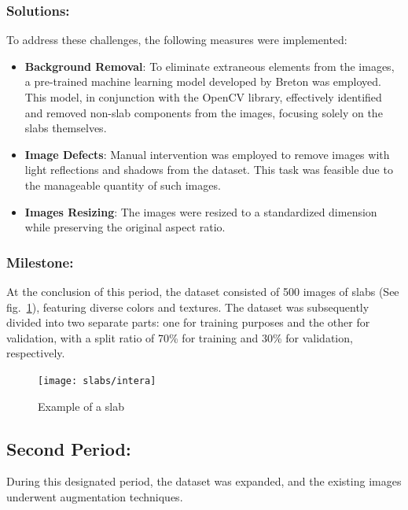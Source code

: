 \subsubsection{Solutions:}
To address these challenges, the following measures were implemented:
\begin{itemize}
    \item \textbf{Background Removal}: To eliminate extraneous elements from the images, a pre-trained machine learning model developed by Breton was employed. 
    This model, in conjunction with the OpenCV library, effectively identified and removed non-slab components from the images, focusing solely on the slabs themselves.
    \item \textbf{Image Defects}: Manual intervention was employed to remove images with light reflections and shadows from the dataset. 
    This task was feasible due to the manageable quantity of such images.
    \item \textbf{Images Resizing}: The images were resized to a standardized dimension while preserving the original aspect ratio.
\end{itemize}
\subsubsection{Milestone:}
At the conclusion of this period, the dataset consisted of 500 images of slabs (See fig.~\ref{fig:slab-sample}), featuring diverse colors and textures. 
The dataset was subsequently divided into two separate parts: one for training purposes and the other for validation, with a split ratio of 70\% for training and 30\% for validation, respectively.
\begin{figure}
    \centering
    \texttt{[image: slabs/intera]}
    \caption{Example of a slab}\label{fig:slab-sample}
\end{figure}

\subsection{Second Period:}
During this designated period, the dataset was expanded, and the existing images underwent augmentation techniques.
